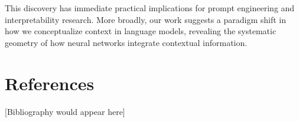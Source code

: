 \documentclass[11pt]{article}
\begin{document}
This discovery has immediate practical implications for prompt engineering and interpretability research. More broadly, our work suggests a paradigm shift in how we conceptualize context in language models, revealing the systematic geometry of how neural networks integrate contextual information.

\section*{References}

[Bibliography would appear here]
\end{document}
